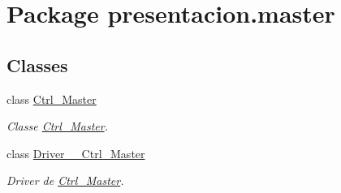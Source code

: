 \hypertarget{namespacepresentacion_1_1master}{}\section{Package presentacion.\+master}
\label{namespacepresentacion_1_1master}
\subsection*{Classes}
\begin{DoxyCompactItemize}
\item 
class \hyperlink{classpresentacion_1_1master_1_1Ctrl__Master}{Ctrl\+\_\+\+Master}
\begin{DoxyCompactList}\small\item\em Classe \hyperlink{classpresentacion_1_1master_1_1Ctrl__Master}{Ctrl\+\_\+\+Master}. \end{DoxyCompactList}\item 
class \hyperlink{classpresentacion_1_1master_1_1Driver____Ctrl__Master}{Driver\+\_\+\+\_\+\+Ctrl\+\_\+\+Master}
\begin{DoxyCompactList}\small\item\em Driver de \hyperlink{classpresentacion_1_1master_1_1Ctrl__Master}{Ctrl\+\_\+\+Master}. \end{DoxyCompactList}\end{DoxyCompactItemize}
